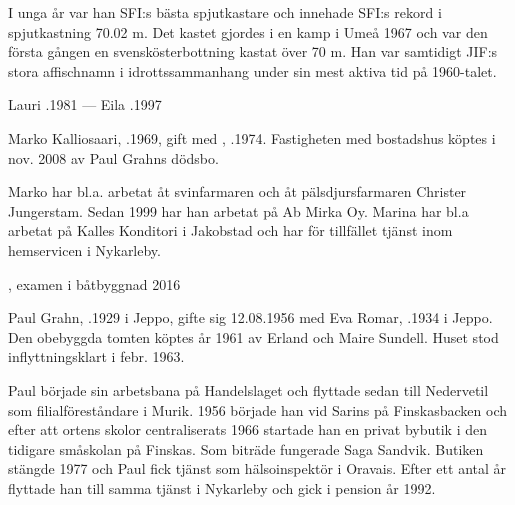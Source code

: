 I unga år var han SFI:s bästa spjutkastare och innehade SFI:s rekord i spjutkastning 70.02 m. Det kastet gjordes i en kamp i Umeå 1967 och var den första gången en svenskösterbottning kastat över 70 m. Han var samtidigt JIF:s stora affischnamn i idrottssammanhang under sin mest aktiva tid på 1960-talet.

Lauri .1981  ---  Eila .1997



%



%
Marko Kalliosaari, .1969, gift med , .1974. Fastigheten med bostadshus köptes i nov. 2008 av Paul Grahns dödsbo.

Marko har bl.a. arbetat åt svinfarmaren  och åt pälsdjursfarmaren Christer Jungerstam. Sedan 1999 har han arbetat på Ab Mirka Oy. Marina har bl.a arbetat på Kalles Konditori i Jakobstad  och har för tillfället tjänst inom hemservicen i Nykarleby.
\begin{jhchildren}
  \item {}, examen i båtbyggnad 2016
  \item {}
  \item {}
\end{jhchildren}


%
Paul Grahn, .1929 i Jeppo, gifte sig 12.08.1956 med Eva Romar, .1934 i Jeppo. Den obebyggda tomten köptes år 1961 av Erland och Maire Sundell. Huset stod inflyttningsklart i febr. 1963.

Paul började sin arbetsbana på Handelslaget och flyttade sedan till Nedervetil som filialföreståndare i Murik. 1956 började han vid Sarins på Finskasbacken och efter att ortens skolor centraliserats 1966 startade han en privat bybutik i den tidigare småskolan på Finskas. Som biträde fungerade Saga Sandvik. Butiken stängde 1977 och Paul fick tjänst som hälsoinspektör i Oravais. Efter ett antal år flyttade han till samma tjänst i Nykarleby och gick i pension år 1992.

